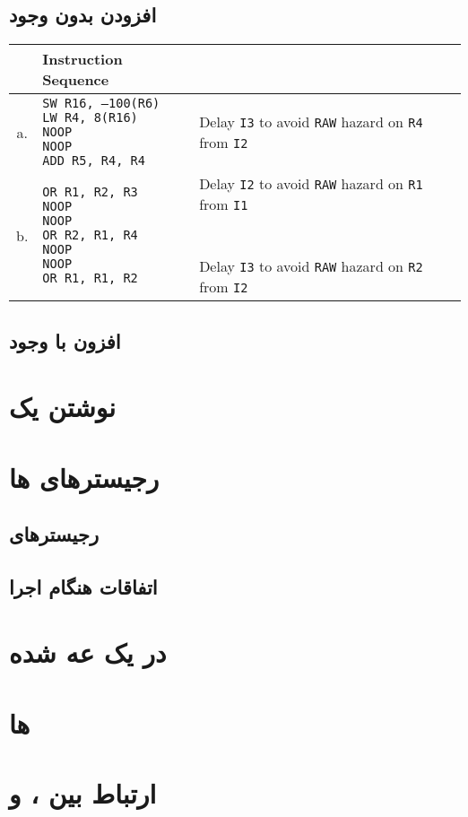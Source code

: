 \documentclass[11pt, dvipsnames, svgnames, x11names]{article}
\begin{document}
\subsection{افزودن  بدون وجود }
\begin{latin}
\begin{table}[H]
\begin{center}
\begin{tabular}{|c|l|l|}
\hline
& Instruction Sequence & \\
\hline
a. &
\makecell[l]{
\texttt{SW R16, –100(R6)} \\
\texttt{LW  R4, 8(R16)} \\
\texttt{NOOP} \\
\texttt{NOOP} \\
\texttt{ADD R5, R4, R4}}&
Delay \texttt{I3} to avoid \texttt{RAW} hazard on \texttt{R4} from \texttt{I2}\\
\hline
b. &
\makecell[l]{
\texttt{OR R1, R2, R3} \\
\texttt{NOOP} \\
\texttt{NOOP} \\
\texttt{OR R2, R1, R4} \\
\texttt{NOOP} \\
\texttt{NOOP} \\
\texttt{OR R1, R1, R2} \\
} &
\makecell[l]{
Delay \texttt{I2} to avoid \texttt{RAW} hazard on \texttt{R1} from \texttt{I1} \\ \\ \\
Delay \texttt{I3} to avoid \texttt{RAW} hazard on \texttt{R2} from \texttt{I2}}
\\
\hline
\end{tabular}
\end{center}
\end{table}
\end{latin}

\subsection{افزون  با وجود }
\section{نوشتن یک }
\section{رجیستر‌های ها}
\subsection{رجیستر‌های }
\subsection{اتفاقات هنگام اجرا}
\section{ در یک  عه  شده}
\section{ها}
\section{ارتباط بین ،  و }
\end{document}
